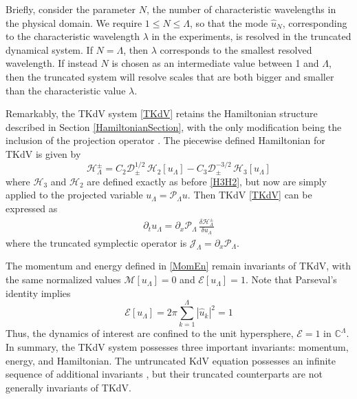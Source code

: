 \documentclass[11pt]{article}
\newcommand{\abs}[1]{\left| #1 \right|}
\newcommand{\CC}{{\mathbb{C}}}
\newcommand{\lam}{\lambda}
\newcommand{\lamfac}{N}
\newcommand{\drat}{\mathcal{D}}
\newcommand{\dratupdn}{\drat_{\pm}}
\newcommand{\En}{\mathcal{E}}
\newcommand{\Mo}{\mathcal{M}}
\newcommand{\uhat}{\hat{u}}
\newcommand{\sympJ}{\mathcal{J}}
\newcommand{\vard}[2]{\frac{\delta #1}{\delta #2}}
\newcommand{\Ham}{\mathcal{H}}
\newcommand{\Hthree}{\Ham_{3}}
\newcommand{\Htwo}{\Ham_{2}}
\newcommand{\Proj}{\mathcal{P}_{\Lambda}}
\newcommand{\uL}{u_{\Lambda}}
\newcommand{\HLupdn}{\Ham_{\Lambda}^{\pm}}
\newcommand{\SympL}{\sympJ_{\Lambda}}
\begin{document}
Briefly, consider the parameter $\lamfac$, the number of characteristic wavelengths in the physical domain. We require $1 \le \lamfac \le \Lambda$, so that the mode $\uhat_{\lamfac}$, corresponding to the characteristic wavelength $\lam$ in the experiments, is resolved in the truncated dynamical system. If $\lamfac = \Lambda$, then $\lam$ corresponds to the smallest resolved wavelength. If instead $\lamfac$ is chosen as an intermediate value between 1 and $\Lambda$, then the truncated system will resolve scales that are both bigger and smaller than the characteristic value $\lam$.

Remarkably, the TKdV system \eqref{TKdV} retains the Hamiltonian structure described in Section \ref{HamiltonianSection}, with the only modification being the inclusion of the projection operator \cite{bajars2013weakly, majda2019}. The piecewise defined Hamiltonian for TKdV is given by
\begin{equation}
\label{TruncHamiltonian}
\HLupdn = C_2 \dratupdn^{1/2} \, \Htwo[\uL] - C_3 \dratupdn^{-3/2} \, \Hthree[\uL]
\end{equation}
where $\Hthree$ and $\Htwo$ are defined exactly as before \eqref{H3H2}, but now are simply applied to the projected variable $\uL = \Proj u$.
Then TKdV \eqref{TKdV} can be expressed as
\begin{align}
\partial_t {\uL} = \partial_x \Proj \, \vard{\HLupdn}{\uL}
\end{align}
where the truncated symplectic operator is $\SympL = \partial_x \Proj$.

The momentum and energy defined in \eqref{MomEn} remain invariants of TKdV, with the same normalized values $\Mo[\uL] = 0$ and $\En[\uL] = 1$. Note that Parseval's identity implies
\begin{equation}
\En[\uL] = 2 \pi \sum_{k=1}^{\Lambda} \abs{\uhat_k}^2 = 1
\end{equation}
Thus, the dynamics of interest are confined to the unit hypersphere, $\En = 1$ in $\CC^{\Lambda}$.
In summary, the TKdV system possesses three important invariants: momentum, energy, and Hamiltonian. The untruncated KdV equation possesses an infinite sequence of additional invariants \cite{lax1975periodic, whitham2011linear}, but their truncated counterparts are not generally invariants of TKdV.


\end{document}
